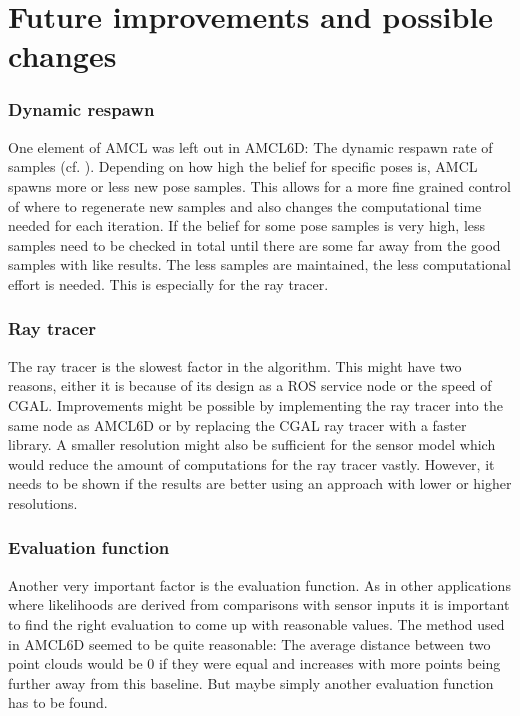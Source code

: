\documentclass[Thesis.tex]{subfiles}
\begin{document}
\chapter{Future improvements and possible changes}

\subsection*{Dynamic respawn}

One element of \gls{AMCL} was left out in \gls{AMCL6D}: The dynamic respawn rate of samples (cf. \cite{ThrunBurgardFox:2005}). Depending on how high the belief for specific poses is, \gls{AMCL} spawns more or less new pose samples. This allows for a more fine grained control of where to regenerate new samples and also changes the computational time needed for each iteration. If the belief for some pose samples is very high, less samples need to be checked in total until there are some far away from the good samples with like results. The less samples are maintained, the less computational effort is needed. This is especially for the ray tracer.

\subsection*{Ray tracer}

The ray tracer is the slowest factor in the algorithm. This might have two reasons, either it is because of its design as a \gls{ROS} service node or the speed of \gls{CGAL}. Improvements might be possible by implementing the ray tracer into the same node as \gls{AMCL6D} or by replacing the \gls{CGAL} ray tracer with a faster library. A smaller resolution might also be sufficient for the sensor model which would reduce the amount of computations for the ray tracer vastly. However, it needs to be shown if the results are better using an approach with lower or higher resolutions.

\subsection*{Evaluation function}

Another very important factor is the evaluation function. As in other applications where likelihoods are derived from comparisons with sensor inputs it is important to find the right evaluation to come up with reasonable values. The method used in \gls{AMCL6D} seemed to be quite reasonable: The average distance between two point clouds would be 0 if they were equal and increases with more points being further away from this baseline. But maybe simply another evaluation function has to be found. 
\end{document}

